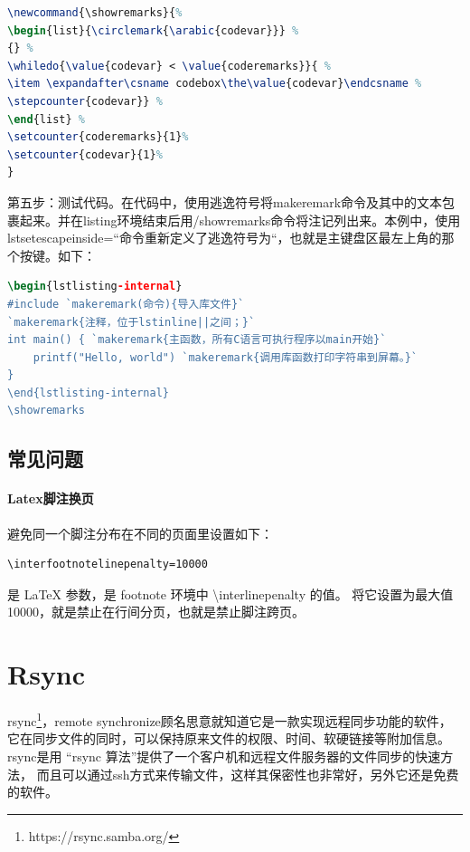 \documentclass{book}
\newcounter{coderemarks}   %
\newcounter{codevar}     %
\newcommand{\circlemark}[1]{%
\tikz\node[text=white,font=\sffamily\bfseries,inner sep=0.2mm,draw,circle,fill=black]{#1};}
\newcommand{\showremarks}{%
\begin{list}{\circlemark{\arabic{codevar}}} %
{} %
\whiledo{\value{codevar} < \value{coderemarks}}{ %
\item \expandafter\csname codebox\the\value{codevar}\endcsname %
\stepcounter{codevar}} %
\end{list} %
\setcounter{coderemarks}{1}%
\setcounter{codevar}{1}%
}
\begin{document}
\begin{lstlisting}[language=TeX]
\newcommand{\showremarks}{%
\begin{list}{\circlemark{\arabic{codevar}}} %
{} %
\whiledo{\value{codevar} < \value{coderemarks}}{ %
\item \expandafter\csname codebox\the\value{codevar}\endcsname %
\stepcounter{codevar}} %
\end{list} %
\setcounter{coderemarks}{1}%
\setcounter{codevar}{1}%
}
\end{lstlisting}

第五步：测试代码。在代码中，使用逃逸符号将makeremark命令及其中的文本包裹起来。并在listing环境结束后用/showremarks命令将注记列出来。本例中，使用lstset{escapeinside=``}命令重新定义了逃逸符号为``，也就是主键盘区最左上角的那个按键。如下：

\begin{lstlisting}[language=TeX]
\begin{lstlisting-internal}
#include `makeremark(命令){导入库文件}`
`makeremark{注释，位于lstinline||之间；}`
int main() { `makeremark{主函数，所有C语言可执行程序以main开始}`
    printf("Hello, world") `makeremark{调用库函数打印字符串到屏幕。}`
}
\end{lstlisting-internal}
\showremarks
\end{lstlisting}

\subsection{常见问题}

\paragraph{Latex脚注换页}

避免同一个脚注分布在不同的页面里设置如下：

\begin{lstlisting}[language=Tex]
%Interline penalty for footnotes
\interfootnotelinepenalty=10000
\end{lstlisting} 

是 LaTeX 参数，是 footnote 环境中 \textbackslash interlinepenalty 的值。
将它设置为最大值 10000，就是禁止在行间分页，也就是禁止脚注跨页。

\section{Rsync}

rsync\footnote{https://rsync.samba.org/}，remote synchronize顾名思意就知道它是一款实现远程同步功能的软件，
它在同步文件的同时，可以保持原来文件的权限、时间、软硬链接等附加信息。 
rsync是用 “rsync 算法”提供了一个客户机和远程文件服务器的文件同步的快速方法，
而且可以通过ssh方式来传输文件，这样其保密性也非常好，另外它还是免费的软件。
\end{document}
